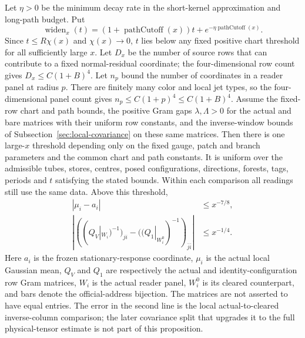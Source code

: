 \begin{proposition}
Let $\eta>0$ be the minimum decay rate in the short-kernel approximation
and long-path budget. Put
\begin{equation}\label{eq:ex-lattice-reader-widening}
 \operatorname{widen}_x(t)=(1+\operatorname{pathCutoff}(x))t
                         +e^{-\eta\operatorname{pathCutoff}(x)}.
\end{equation}
Since $t\le R\chi(x)$ and $\chi(x)\to0$, $t$ lies below any fixed
positive chart threshold for all sufficiently large $x$.
Let $D_x$ be the number of source rows that can contribute to a fixed
normal-residual coordinate; the four-dimensional row count gives
$D_x\le C(1+B)^4$. Let $n_p$ bound the number of coordinates in a
reader panel at radius $p$. There are finitely many color and local jet
types, so the four-dimensional panel count gives
$n_p\le C(1+p)^4\le C(1+B)^4$. Assume the fixed-row chart and path
bounds, the positive Gram gaps $\lambda,\Lambda>0$ for the actual and
bare matrices with their uniform row constants, and the inverse-window
bounds of Subsection~\ref{sec:local-covariance} on these same matrices.
Then there is one large-$x$ threshold depending only on the fixed gauge,
patch and branch parameters and the common chart and path constants. It
is uniform over the admissible tubes, stores, centres, posed configurations,
directions, forests, tags, periods and $t$ satisfying the stated bounds.
Within each comparison all readings still use the same data. Above this
threshold,
\begin{align}
 |\mu_i-a_i|&\le x^{-7/8},
 \label{eq:ex-lattice-reader-mean}\\
 |((Q_V|_{W_i})^{-1})_{ji}-((Q_1|_{W_i^0})^{-1})_{\bar j\bar i}|
      &\le x^{-1/4}.
 \label{eq:ex-lattice-reader-column}
\end{align}
Here $a_i$ is the frozen stationary-response coordinate, $\mu_i$ is
the actual local Gaussian mean, $Q_V$ and $Q_1$ are respectively the
actual and identity-configuration row Gram matrices, $W_i$ is the
actual reader panel, $W_i^0$ is its cleared counterpart, and bars
denote the official-address bijection.  The matrices are not asserted
to have equal entries.  The error in the second line is the local
actual-to-cleared inverse-column comparison; the later covariance
split that upgrades it to the full physical-tensor estimate is not part
of this proposition.
\end{proposition}

